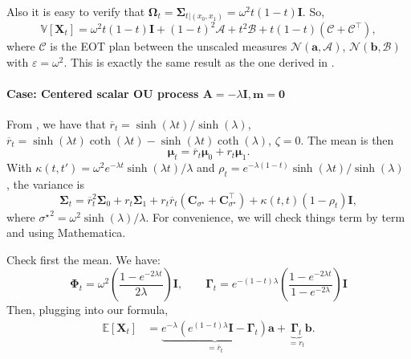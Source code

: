 \documentclass{article}
\newcommand{\E}{\mathbb{E}}
\newcommand{\V}{\mathbb{V}}
\newcommand{\Id}{\mathbf{I}}
\newcommand{\Nc}{\mathcal{N}}
\newcommand{\Ac}{\mathcal{A}}
\newcommand{\Bc}{\mathcal{B}}
\newcommand{\Cc}{\mathcal{C}}
\theoremstyle{newstyle}
\begin{document}
Also it is easy to verify that $\bm{\Omega}_t = \bm{\Sigma}_{t | (x_0, x_1)} = \omega^2 t (1-t) \Id$. 
So,
\begin{equation}
  \V[\bm{X}_t] = \omega^2 t(1-t) \Id + (1-t)^2 \bm{\Ac} + t^2 \bm{\Bc} + t (1-t) (\bm{\Cc} + \bm{\Cc}^\top), 
\end{equation}
where $\bm{\Cc}$ is the EOT plan between the unscaled measures $\Nc(\bm{a}, \bm{\Ac})$, $\Nc(\bm{b}, \bm{\Bc})$ with $\varepsilon = \omega^2$. This is exactly the same result as the one derived in \cite{bunne2023schrodinger}. 

\paragraph{Case: Centered scalar OU process $\bm{A} = -\lambda \Id, \bm{m} = \bm{0}$}

From \cite[Table 1]{bunne2023schrodinger}, we have that $\overline{r}_t = \sinh(\lambda t)/\sinh(\lambda)$, $\overline{r}_t = \sinh(\lambda t) \coth(\lambda t) - \sinh(\lambda t) \coth(\lambda)$, $\zeta = 0$. The mean is then
\begin{equation}
  \bm{\mu}_t = \overline{r}_t \bm{\mu}_0 + r_t \bm{\mu}_1.
\end{equation}
With $\kappa(t, t') = \omega^2 e^{-\lambda t} \sinh(\lambda t) / \lambda$ and $\rho_t = e^{-\lambda(1-t)} \sinh(\lambda t) / \sinh(\lambda)$ , the variance is
\begin{equation}
  \bm{\Sigma}_t = \overline{r}_t^2 \bm{\Sigma}_0 + r_t \bm{\Sigma}_1 + r_t \overline{r}_t (\bm{C}_{\sigma^\star} + \bm{C}_{\sigma^\star}^\top) + \kappa(t, t) (1 - \rho_t) \Id,
\end{equation}
where ${\sigma^\star}^2 = \omega^2 \sinh(\lambda) / \lambda$. For convenience, we will check things term by term and using Mathematica.

Check first the mean. We have:
\begin{equation}
  \bm{\Phi}_t = \omega^2 \left( \frac{1 - e^{-2\lambda t}}{2\lambda} \right) \Id, \qquad \bm{\Gamma}_t = e^{-(1-t)\lambda} \left( \frac{1 - e^{-2\lambda t}}{1 - e^{-2\lambda}} \right) \Id
\end{equation}
Then, plugging into our formula,
\begin{align}
  \E[\bm{X}_t] &= \underbrace{ e^{-\lambda} (e^{(1-t)\lambda} \Id - \bm{\Gamma}_t)}_{=\overline{r}_t} \bm{a} + \underbrace{\bm{\Gamma}_t}_{=r_t} \bm{b}. 
\end{align}
\end{document}
